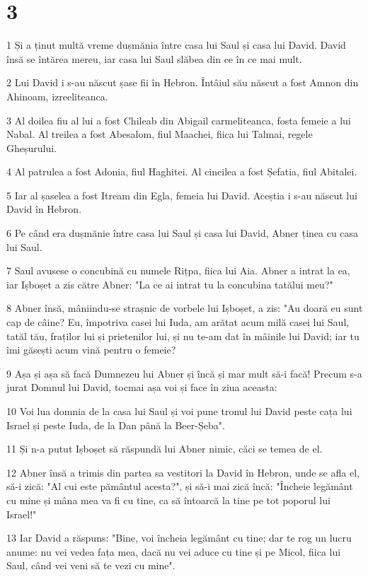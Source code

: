 \chapter{3}

\par 1 Și a ținut multă vreme dușmănia între casa lui Saul și casa lui David. David însă se întărea mereu, iar casa lui Saul slăbea din ce în ce mai mult.
\par 2 Lui David i s-au născut șase fii în Hebron. Întâiul său născut a fost Amnon din Ahinoam, izreeliteanca.
\par 3 Al doilea fiu al lui a fost Chileab din Abigail carmeliteanca, fosta femeie a lui Nabal. Al treilea a fost Abesalom, fiul Maachei, fiica lui Talmai, regele Gheșurului.
\par 4 Al patrulea a fost Adonia, fiul Haghitei. Al cincilea a fost Șefatia, fiul Abitalei.
\par 5 Iar al șaselea a fost Itream din Egla, femeia lui David. Aceștia i s-au născut lui David în Hebron.
\par 6 Pe când era dușmănie între casa lui Saul și casa lui David, Abner ținea cu casa lui Saul.
\par 7 Saul avusese o concubină cu numele Rițpa, fiica lui Aia. Abner a intrat la ea, iar Ișboșet a zis către Abner: "La ce ai intrat tu la concubina tatălui meu?"
\par 8 Abner însă, mâniindu-se strașnic de vorbele lui Ișboșet, a zis: "Au doară eu sunt cap de câine? Eu, împotriva casei lui Iuda, am arătat acum milă casei lui Saul, tatăl tău, fraților lui și prietenilor lui, și nu te-am dat în mâinile lui David; iar tu îmi găsești acum vină pentru o femeie?
\par 9 Așa și așa să facă Dumnezeu lui Abner și încă și mar mult să-i facă! Precum s-a jurat Domnul lui David, tocmai așa voi și face în ziua aceasta:
\par 10 Voi lua domnia de la casa lui Saul și voi pune tronul lui David peste cața lui Israel și peste Iuda, de la Dan până la Beer-Șeba".
\par 11 Și n-a putut Ișboșet să răspundă lui Abner nimic, căci se temea de el.
\par 12 Abner însă a trimis din partea sa vestitori la David în Hebron, unde se afla el, să-i zică: "Al cui este pământul acesta?", și să-i mai zică încă: "Încheie legământ cu mine și mâna mea va fi cu tine, ca să întoarcă la tine pe tot poporul lui Israel!"
\par 13 Iar David a răspuns: "Bine, voi încheia legământ cu tine; dar te rog un lucru anume: nu vei vedea fața mea, dacă nu vei aduce cu tine și pe Micol, fiica lui Saul, când vei veni să te vezi cu mine".

